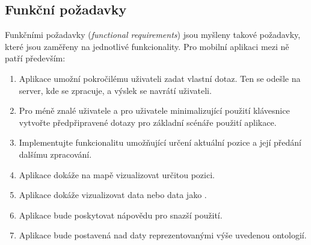 \subsection{Funkční požadavky}
Funkčními požadavky (\textit{functional requirements}) jsou myšleny takové požadavky, které jsou zaměřeny na jednotlivé funkcionality. Pro mobilní aplikaci mezi ně patří především:

\begin{enumerate}
 \item Aplikace umožní pokročilému uživateli zadat vlastní  dotaz. Ten se odešle na server, kde se zpracuje, a výslek se navrátí uživateli.
 \item Pro méně znalé uživatele  a pro uživatele minimalizující použití klávesnice vytvořte předpřipravené dotazy pro základní scénáře použití aplikace.
 \item Implementujte funkcionalitu umožňující určení aktuální pozice a její předání dalšímu zpracování.
 \item Aplikace dokáže na mapě vizualizovat určitou pozici.
 \item Aplikace dokáže vizualizovat  data nebo data jako .
 \item Aplikace bude poskytovat nápovědu pro snazší použití.
 \item Aplikace bude postavená nad daty reprezentovanými výše uvedenou ontologií.
\end{enumerate}

